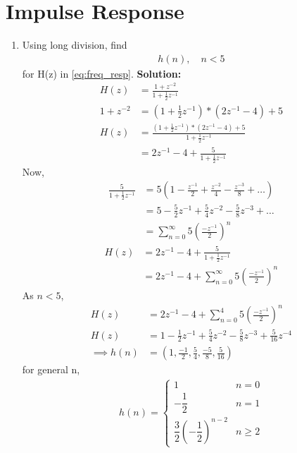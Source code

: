 \documentclass[journal,12pt,twocolumn]{IEEEtran}
\newcommand{\solution}{\noindent \textbf{Solution: }}
\providecommand{\brak}[1]{\ensuremath{\left(#1\right)}}
\numberwithin{equation}{section}
\renewcommand\thesection{\arabic{section}}
\renewcommand\thesection{\arabic{section}}
\begin{document}
\section{Impulse Response}
\begin{enumerate}[label=\thesection.\arabic*]
	\item Using long division, 
find
		\begin{align}
			h(n), \quad n < 5
		\end{align}
		for H(z) in 
		\eqref{eq:freq_resp}.
\solution\\
\begin{align}
	H(z) &= \frac{1 + z^{-2}}{1 + \frac{1}{2}z^{-1}} \\
	1+z^{-2} &= \left(1 + \frac{1}{2}z^{-1}\right)*\left(2z^{-1}-4\right) + 5 \\
	H(z)&= \frac{\left(1 + \frac{1}{2}z^{-1}\right)*\left(2z^{-1}-4\right) + 5}{1 + \frac{1}{2}z^{-1}} \\
	&= 2z^{-1}-4 + \frac{5}{1 + \frac{1}{2}z^{-1}}
\end{align}
Now,
\begin{align}
	\frac{5}{1 + \frac{1}{2}z^{-1}} &= 5\left(1-\frac{z^{-1}}{2}+\frac{z^{-2}}{4}-\frac{z^{-3}}{8}+\dots\right) \\
	&= 5-\frac{5}{2}z^{-1}+\frac{5}{4}z^{-2}-\frac{5}{8}z^{-3}+\dots \\
	&= \sum_{n = 0}^{\infty}  5 \left(\frac{-z^{-1}}{2}\right)^n
\end{align}
\begin{align}
	H(z)&= 2z^{-1}-4 + \frac{5}{1 + \frac{1}{2}z^{-1}} \\
	&= 2z^{-1}-4 + \sum_{n = 0}^{\infty}  5 \left(\frac{-z^{-1}}{2}\right)^n 
\end{align}
As $n<5$,
\begin{align}
	H(z) &= 2z^{-1}-4 + \sum_{n = 0}^{4}  5 \left(\frac{-z^{-1}}{2}\right)^n \\
	H(z) &= 1-\frac{1}{2}z^{-1}+\frac{5}{4}z^{-2}-\frac{5}{8}z^{-3}+\frac{5}{16}z^{-4} \\
	\implies h(n) &= \brak{1, \frac{-1}{2}, \frac{5}{4}, \frac{-5}{8}, \frac{5}{16}}
\end{align}
for general n,
\begin{align}
	h(n) = 
	\begin{cases}
		 1 & n = 0 \\
		 -\dfrac{1}{2} & n = 1 \\
		 \dfrac{3}{2} \brak{-\dfrac12}^{n-2} & n \ge 2
	\end{cases}
\end{align}
		

\end{enumerate}
\end{document}
